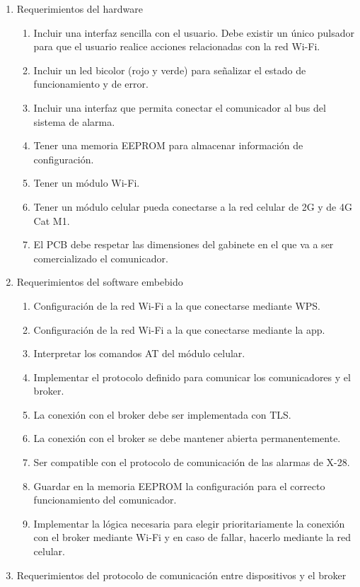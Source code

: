 \documentclass[
11pt, %
]{charter}
\begin{document}
\begin{enumerate}
	\item Requerimientos del hardware
		\begin{enumerate}
			\item Incluir una interfaz sencilla con el usuario. Debe existir un único pulsador para que el usuario realice acciones relacionadas con la red Wi-Fi.
			\item Incluir un led bicolor (rojo y verde) para señalizar el estado de funcionamiento y de error.
			\item Incluir una interfaz que permita conectar el comunicador al bus del sistema de alarma.
			\item Tener una memoria EEPROM para almacenar información de configuración.
			\item Tener un módulo Wi-Fi.
			\item Tener un módulo celular pueda conectarse a la red celular de 2G y de 4G Cat M1.
			\item El PCB debe respetar las dimensiones del gabinete en el que va a ser comercializado el comunicador.
		\end{enumerate}
	\item Requerimientos del software embebido
		\begin{enumerate}
			\item Configuración de la red Wi-Fi a la que conectarse mediante WPS.
			\item Configuración de la red Wi-Fi a la que conectarse mediante la app.
			\item Interpretar los comandos AT del módulo celular.
			\item Implementar el protocolo definido para comunicar los comunicadores y el broker.
			\item La conexión con el broker debe ser implementada con TLS.
			\item La conexión con el broker se debe mantener abierta permanentemente.
			\item Ser compatible con el protocolo de comunicación de las alarmas de X-28.
			\item Guardar en la memoria EEPROM la configuración para el correcto funcionamiento del comunicador.
			\item Implementar la lógica necesaria para elegir prioritariamente la conexión con el broker mediante Wi-Fi y en caso de fallar, hacerlo mediante la red celular.
		\end{enumerate}
	\item Requerimientos del protocolo de comunicación entre dispositivos y el broker

\end{enumerate}
\end{document}
